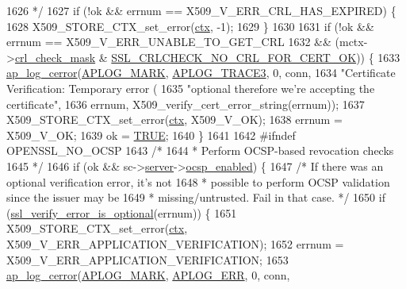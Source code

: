 \begin{DoxyCode}
{{1626 \textcolor{comment}{     */}
1627     \textcolor{keywordflow}{if} (!ok && errnum == X509\_V\_ERR\_CRL\_HAS\_EXPIRED) \{
1628         X509\_STORE\_CTX\_set\_error(\hyperlink{group__APACHE__CORE__FILTER_ga94af791485570bea922969fef12d6259}{ctx}, -1);
1629     \}
1630 
1631     \textcolor{keywordflow}{if} (!ok && errnum == X509\_V\_ERR\_UNABLE\_TO\_GET\_CRL
1632             && (mctx->\hyperlink{structmodssl__ctx__t_a0951fd82c695f7083019c281a8ac9273}{crl\_check\_mask} & 
      \hyperlink{group__MOD__SSL__PRIVATE_gga58bfe4388671e2ac78648b9179ee7125a5aca9f13854d5d11c78ac5c78b4daf0f}{SSL\_CRLCHECK\_NO\_CRL\_FOR\_CERT\_OK})) \{
1633         \hyperlink{group__APACHE__CORE__LOG_ga60ef6919b8e1b691b0c1ac4d67c9449f}{ap\_log\_cerror}(\hyperlink{group__APACHE__CORE__LOG_ga655e126996849bcb82e4e5a14c616f4a}{APLOG\_MARK}, \hyperlink{group__APACHE__CORE__LOG_ga5e4f134ae2203dd339774d9549d814db}{APLOG\_TRACE3}, 0, conn,
1634                       \textcolor{stringliteral}{"Certificate Verification: Temporary error (%
1635                       \textcolor{stringliteral}{"optional therefore we're accepting the certificate"},
1636                       errnum, X509\_verify\_cert\_error\_string(errnum));
1637         X509\_STORE\_CTX\_set\_error(\hyperlink{group__APACHE__CORE__FILTER_ga94af791485570bea922969fef12d6259}{ctx}, X509\_V\_OK);
1638         errnum = X509\_V\_OK;
1639         ok = \hyperlink{group__MOD__SSL__PRIVATE_gaa8cecfc5c5c054d2875c03e77b7be15d}{TRUE};
1640     \}
1641 
1642 \textcolor{preprocessor}{#ifndef OPENSSL\_NO\_OCSP}
1643     \textcolor{comment}{/*}
1644 \textcolor{comment}{     * Perform OCSP-based revocation checks}
1645 \textcolor{comment}{     */}
1646     \textcolor{keywordflow}{if} (ok && sc->\hyperlink{structSSLSrvConfigRec_a7941dbc2f9fa504b3968a4afdc4b96fc}{server}->\hyperlink{structmodssl__ctx__t_a9a3bce44f2aabbfeda02bc01ee0f9d51}{ocsp\_enabled}) \{
1647         \textcolor{comment}{/* If there was an optional verification error, it's not}
1648 \textcolor{comment}{         * possible to perform OCSP validation since the issuer may be}
1649 \textcolor{comment}{         * missing/untrusted.  Fail in that case. */}
1650         \textcolor{keywordflow}{if} (\hyperlink{group__MOD__SSL__PRIVATE_ga479773343fd970be23c26b9a354e0c51}{ssl\_verify\_error\_is\_optional}(errnum)) \{
1651             X509\_STORE\_CTX\_set\_error(\hyperlink{group__APACHE__CORE__FILTER_ga94af791485570bea922969fef12d6259}{ctx}, X509\_V\_ERR\_APPLICATION\_VERIFICATION);
1652             errnum = X509\_V\_ERR\_APPLICATION\_VERIFICATION;
1653             \hyperlink{group__APACHE__CORE__LOG_ga60ef6919b8e1b691b0c1ac4d67c9449f}{ap\_log\_cerror}(\hyperlink{group__APACHE__CORE__LOG_ga655e126996849bcb82e4e5a14c616f4a}{APLOG\_MARK}, \hyperlink{group__APACHE__CORE__LOG_ga57ad94ed8c92c4306de90479251a5d58}{APLOG\_ERR}, 0, conn, 
}}}
\end{DoxyCode}
